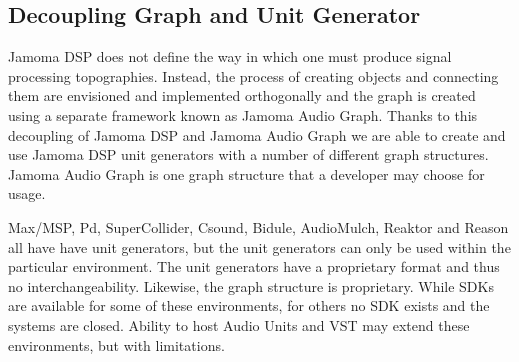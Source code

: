 \documentclass[twoside,a4paper]{article}
\begin{document}

\subsection{Decoupling Graph and Unit Generator} %

Jamoma DSP does not define the way in which one must produce signal processing topographies.  
Instead, the process of creating objects and connecting them are envisioned and implemented orthogonally and the graph is created using a separate framework known as Jamoma Audio Graph.  
Thanks to this decoupling of Jamoma DSP and Jamoma Audio Graph we are able to create and use Jamoma DSP unit generators with a number of different graph structures.  
Jamoma Audio Graph is one graph structure that a developer may choose for usage.

Max/MSP, Pd, SuperCollider, Csound, Bidule, AudioMulch, Reaktor and Reason all have have unit generators, but the unit generators can only be used within the particular environment. 
The unit generators have a proprietary format and thus no interchangeability.  Likewise, the graph structure is proprietary. 
While SDKs are available for some of these environments, for others no SDK exists and the systems are closed. 
Ability to host Audio Units and VST may extend these environments, but with limitations.
\end{document}
